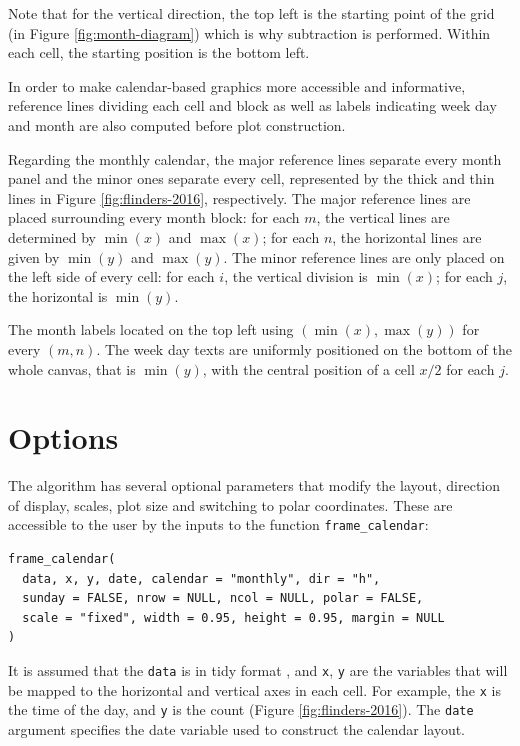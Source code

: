 \documentclass[12pt]{article}
\begin{document}
Note that for the vertical direction, the top left is the starting point
of the grid (in Figure \ref{fig:month-diagram}) which is why subtraction
is performed. Within each cell, the starting position is the bottom
left.

In order to make calendar-based graphics more accessible and
informative, reference lines dividing each cell and block as well as
labels indicating week day and month are also computed before plot
construction.

Regarding the monthly calendar, the major reference lines separate every
month panel and the minor ones separate every cell, represented by the
thick and thin lines in Figure \ref{fig:flinders-2016}, respectively.
The major reference lines are placed surrounding every month block: for
each \(m\), the vertical lines are determined by \(\min{(x)}\) and
\(\max{(x)}\); for each \(n\), the horizontal lines are given by
\(\min{(y)}\) and \(\max{(y)}\). The minor reference lines are only
placed on the left side of every cell: for each \(i\), the vertical
division is \(\min{(x)}\); for each \(j\), the horizontal is
\(\min{(y)}\).

The month labels located on the top left using
\((\min{(x)}, \max{(y)})\) for every \((m, n)\). The week day texts are
uniformly positioned on the bottom of the whole canvas, that is
\(\min{(y)}\), with the central position of a cell \(x / 2\) for each
\(j\).

\hypertarget{options}{%
\section{Options}\label{options}}

\label{sec:opt}

The algorithm has several optional parameters that modify the layout,
direction of display, scales, plot size and switching to polar
coordinates. These are accessible to the user by the inputs to the
function \texttt{frame\_calendar}:

\begin{verbatim}
frame_calendar(
  data, x, y, date, calendar = "monthly", dir = "h", 
  sunday = FALSE, nrow = NULL, ncol = NULL, polar = FALSE, 
  scale = "fixed", width = 0.95, height = 0.95, margin = NULL
)
\end{verbatim}

It is assumed that the \texttt{data} is in tidy format
\citep{wickham2014tidy}, and \texttt{x}, \texttt{y} are the variables
that will be mapped to the horizontal and vertical axes in each cell.
For example, the \texttt{x} is the time of the day, and \texttt{y} is
the count (Figure \ref{fig:flinders-2016}). The \texttt{date} argument
specifies the date variable used to construct the calendar layout.
\end{document}

